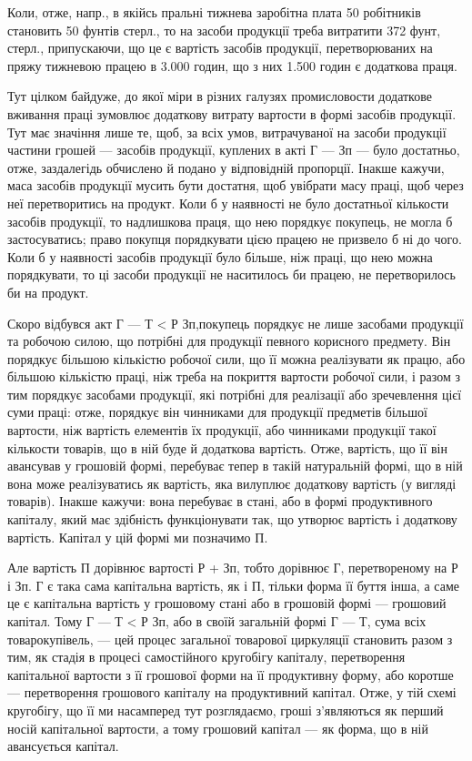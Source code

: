 Коли, отже, напр., в якійсь пральні тижнева заробітна плата 50 робітників
становить 50 фунтів стерл., то на засоби продукції треба витратити
372 фунт, стерл., припускаючи, що це є вартість засобів продукції,
перетворюваних на пряжу тижневою працею в 3.000 годин, що з них
1.500 годин є додаткова праця.

Тут цілком байдуже, до якої міри в різних галузях промисловости
додаткове вживання праці зумовлює додаткову витрату вартости в
формі засобів продукції. Тут має значіння лише те, щоб, за всіх умов,
витрачуваної на засоби продукції частини грошей — засобів продукції,
куплених в акті Г — Зп — було достатньо, отже, заздалегідь обчислено й
подано у відповідній пропорції. Інакше кажучи, маса засобів продукції
мусить бути достатня, щоб увібрати масу праці, щоб через неї перетворитись
на продукт. Коли б у наявності не було достатньої кількости
засобів продукції, то надлишкова праця, що нею порядкує покупець,
не могла б застосуватись; право покупця порядкувати цією
працею не призвело б ні до чого. Коли б у наявності засобів продукції
було більше, ніж праці, що нею можна порядкувати, то ці засоби продукції
не наситилось би працею, не перетворилось би на продукт.

Скоро відбувся акт Г — Т < Р Зп,покупець порядкує не лише засобами продукції та робочою силою, що
потрібні для продукції певного корисного
предмету. Він порядкує більшою кількістю робочої сили, що її
можна реалізувати як працю, або більшою кількістю праці, ніж треба
на покриття вартости робочої сили, і разом з тим порядкує засобами
продукції, які потрібні для реалізації або зречевлення цієї суми
праці: отже, порядкує він чинниками для продукції предметів більшої
вартости, ніж вартість елементів їх продукції, або чинниками
продукції такої кількости товарів, що в ній буде й додаткова вартість.
Отже, вартість, що її він авансував у грошовій формі, перебуває тепер
в такій натуральній формі, що в ній вона може реалізуватись як вартість,
яка вилуплює додаткову вартість (у вигляді товарів). Інакше кажучи:
вона перебуває в стані, або в формі продуктивного капіталу, який має
здібність функціонувати так, що утворює вартість і додаткову вартість.
Капітал у цій формі ми позначимо П.

Але вартість П дорівнює вартості Р + Зп, тобто дорівнює Г,
перетвореному на Р і Зп. Г є така сама капітальна вартість,
як і П, тільки форма її буття інша, а саме це є капітальна
вартість у грошовому стані або в грошовій формі — грошовий капітал.
Тому Г — Т < Р Зп, або в своїй загальній формі Г — Т, сума всіх товарокупівель,
— цей процес загальної товарової циркуляції становить разом з тим,
як стадія в процесі самостійного кругобігу капіталу, перетворення капітальної
вартости з її грошової форми на її продуктивну форму, або
коротше — перетворення грошового капіталу на продуктивний капітал.
Отже, у тій схемі кругобігу, що її ми насамперед тут розглядаємо,
гроші з’являються як перший носій капітальної вартости, а тому грошовий
капітал — як форма, що в ній авансується капітал.

